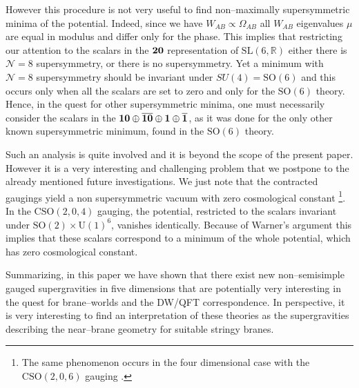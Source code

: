 \documentclass[a4paper,12pt]{article}
\def\bar{\overline}\end {picture}}
\begin{document}
However this procedure is not very useful to find non--maximally
supersymmetric minima of the potential. Indeed, since we have
$W_{AB}\propto\Omega_{AB}$ all $W_{AB}$ eigenvalues $\mu$  are
equal in modulus and differ only for the phase. This implies that
restricting our attention to the scalars in the $\bf 20$
representation of $\mathrm{SL(6,\mathbb{R})}$ either there is
$\mathcal{N}=8$ supersymmetry, or there is no supersymmetry. Yet a
minimum with $\mathcal{N}=8$ supersymmetry should be invariant
under  $SU(4)=\mathrm{SO(6)}$ and this occurs only when all the
scalars are set to zero and only for the $\mathrm{SO(6)}$ theory.
Hence, in the quest for other supersymmetric minima,  one must
necessarily consider the scalars in the $\bf
10\oplus\bar{10}\oplus 1\oplus\bar{1}$, as it was done for the
only other known supersymmetric minimum, found \cite{N2minimum} in
the $\mathrm{SO(6)}$ theory.
\par
Such an analysis is quite involved and it is beyond the scope of
the present paper. However it is a very interesting and
challenging problem that we postpone to the already mentioned
future investigations. We just note that the contracted gaugings
yield a non supersymmetric vacuum with zero cosmological constant
\footnote{The same phenomenon occurs in the four dimensional case
with the $\mathrm{CSO}(2,0,6)$ gauging \cite{hull2}.}. In the
$\mathrm{CSO}(2,0,4)$ gauging, the potential, restricted to the
scalars invariant under $\mathrm{SO(2)}\times \mathrm{U(1)}^6$,
vanishes identically. Because of Warner's argument \cite{schur}
this implies  that these scalars correspond to a minimum of the
whole potential, which has zero cosmological constant.
\par
Summarizing, in this paper we have shown that there exist new
non--semisimple gauged supergravities in five dimensions that are
potentially very interesting in the quest for brane--worlds and
the DW/QFT correspondence. In perspective, it is very interesting
to find an interpretation of these theories as the supergravities
describing the near--brane geometry for suitable stringy branes.
\end{document}
